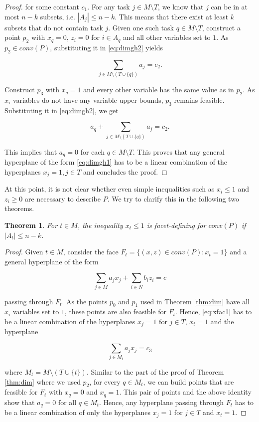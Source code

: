 \documentclass[12pt]{article}
\newtheorem{thm}{Theorem}
\begin{document}
\begin{proof}
for some constant $c_1$. For any task $j \in M \setminus T$, we know that $j$ can be in at most $n-k$ subsets, i.e. $|A_j| \leq n-k$. This means that there exist at least $k$ subsets that do not contain task $j$. Given one such task $q \in M \setminus T$, construct a point $p_2$ with $x_q = 0$, $z_i = 0$ for $i \in A_q$ and all other variables set to $1$. As $p_2 \in conv(P)$, substituting it in \eqref{eq:dimgh2} yields

\[\sum_{j \in M \setminus (T \cup \{q\})} a_j = c_2.\]

Construct $p_3$ with $x_q = 1$ and every other variable has the same value as in $p_2$. As $x_i$ variables do not have any variable upper bounds, $p_3$ remains feasible. Substituting it in \eqref{eq:dimgh2}, we get

\[a_q + \sum_{j \in M \setminus (T \cup \{q\})} a_j = c_2.\]

This implies that $a_q = 0$ for each $q \in M \setminus T$. This proves that any general hyperplane of the form \eqref{eq:dimgh1} has to be a linear combination of the hyperplanes $x_j = 1, j \in T$ and concludes the proof.
\end{proof}

At this point, it is not clear whether even simple inequalities such as $x_i \leq 1$ and $z_i \geq 0$ are necessary to describe $P$. We try to clarify this in the following two theorems.

\begin{thm} \label{thm:xfac}
For $t \in M$, the inequality $x_t \leq 1$ is facet-defining for $conv(P)$ if $|A_t| \leq n-k$.
\end{thm}

\begin{proof}
Given $t \in M$, consider the face $F_t = \{(x,z) \in conv(P) : x_t = 1\}$ and a general hyperplane of the form

\begin{equation} \label{eq:xfac1}
\sum_{j \in M} a_j x_j + \sum_{i \in N} b_i z_i = c
\end{equation}

passing through $F_t$. As the points $p_0$ and $p_1$ used in Theorem \ref{thm:dim} have all $x_i$ variables set to $1$, these points are also feasible for $F_t$. Hence, \eqref{eq:xfac1} has to be a linear combination of the hyperplanes $x_j = 1$ for $j \in T$, $x_t=1$ and the hyperplane 

\[ \sum_{j \in M_t} a_j x_j = c_3\]

where $M_t = M \setminus (T \cup \{t\})$. Similar to the part of the proof of Theorem \ref{thm:dim} where we used $p_2$, for every $q \in M_t$, we can build points that are feasible for $F_t$ with $x_q = 0$ and $x_q = 1$. This pair of points and the above identity show that $a_q = 0$ for all $q \in M_t$. Hence, any hyperplane passing through $F_t$ has to be a linear combination of only the hyperplanes $x_j=1$ for $j \in T$ and $x_t=1$.
\end{proof}
\end{document}
